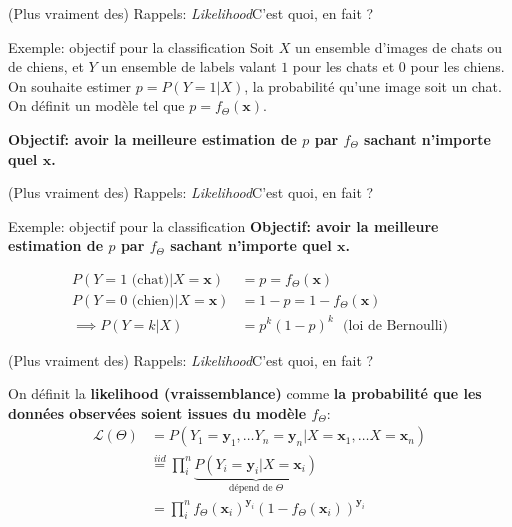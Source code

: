 \documentclass[12pt,dvipsnames,aspectratio=169]{beamer}
\newcommand{\x}[0]{\mathbf{x}}
\newcommand{\y}[0]{\mathbf{y}}
\begin{document}
\begin{frame}{(Plus vraiment des) Rappels: \textit{Likelihood}}{C'est quoi, en fait ?}

    \begin{exampleblock}{Exemple: objectif pour la classification}
        Soit $X$ un ensemble d'images de chats ou de chiens, et $Y$ un ensemble de labels valant $1$ pour les chats et $0$ pour les chiens. On souhaite estimer $p = P(Y=1|X)$, la probabilité qu'une image soit un chat. On définit un modèle tel que $p = f_\Theta(\x)$.
        
        \textbf{Objectif: avoir la meilleure estimation de $p$ par $f_\Theta$ sachant n'importe quel $\x$.}
    \end{exampleblock}

\end{frame}


\begin{frame}{(Plus vraiment des) Rappels: \textit{Likelihood}}{C'est quoi, en fait ?}

    \begin{exampleblock}{Exemple: objectif pour la classification}
        \textbf{Objectif: avoir la meilleure estimation de $p$ par $f_\Theta$ sachant n'importe quel $\x$.}

        \begin{align*}
            P(Y=1 \text{~(chat)}|X=\x) &= p = f_\Theta(\x) \\
            P(Y=0 \text{~(chien)}|X=\x) &= 1-p = 1-f_\Theta(\x) \\
            \implies P(Y=k|X) &= p^k(1-p)^k \text{~~(loi de Bernoulli)} 
        \end{align*}
    \end{exampleblock}

\end{frame}


\begin{frame}{(Plus vraiment des) Rappels: \textit{Likelihood}}{C'est quoi, en fait ?}

        On définit la \textbf{likelihood (vraissemblance)} comme \textbf{la probabilité que les données observées soient issues du modèle $f_\Theta$}:
        \begin{align*}
            \mathcal{L}(\Theta) &= P(Y_1=\y_1, \dots Y_n=\y_n|X=\x_1, \dots X=\x_n) \\
            &\overset{iid}{=} \prod_i^n \underbrace{P(Y_i=\y_i|X=\x_i)}_{\text{dépend de } \Theta} \\
            &= \prod_i^n f_\Theta(\x_i)^{\y_i}(1 - f_\Theta(\x_i))^{\y_i}
        \end{align*}
        
\end{frame}
\end{document}
